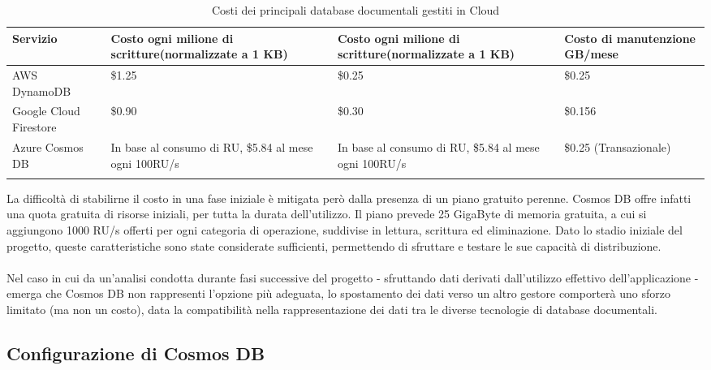 \begin{longtable}{|P{3.2cm}|P{4.2cm}|P{4.2cm}|P{3cm}|}
    \hline
    \textbf{Servizio}      & \textbf{Costo ogni milione di scritture}\newline(normalizzate a 1 KB) & \textbf{Costo ogni milione di scritture}\newline (normalizzate a 1 KB) & \textbf{Costo di manutenzione GB/mese} \\
    \hline
    \endhead
    AWS DynamoDB           & \$1.25                                                                & \$0.25                                                                 & \$0.25                                 \\
    \hline
    Google Cloud Firestore & \$0.90                                                                & \$0.30                                                                 & \$0.156                                \\
    \hline
    Azure Cosmos DB        & In base al consumo di RU, \$5.84 al mese ogni 100RU/s                 & In base al consumo di RU, \$5.84 al mese ogni 100RU/s                  & \$0.25 (Transazionale)                 \\
    \hline
    \caption{Costi dei principali database documentali gestiti in Cloud}
\end{longtable}

La difficoltà di stabilirne il costo in una fase iniziale
è mitigata però dalla presenza di un piano gratuito perenne.
Cosmos DB offre infatti una quota gratuita di risorse iniziali,
per tutta la durata dell'utilizzo.
Il piano prevede 25 GigaByte di memoria gratuita,
a cui si aggiungono 1000 RU/s offerti per ogni categoria di operazione,
suddivise in lettura, scrittura ed eliminazione.
Dato lo stadio iniziale del progetto,
queste caratteristiche sono state considerate sufficienti,
permettendo di sfruttare e testare le sue capacità di distribuzione.\\
\\
Nel caso in cui da un'analisi condotta durante fasi successive del progetto
- sfruttando dati derivati dall'utilizzo effettivo dell'applicazione -
emerga che Cosmos DB non rappresenti l'opzione più adeguata,
lo spostamento dei dati verso un altro gestore comporterà uno sforzo limitato (ma non un costo),
data la compatibilità nella rappresentazione dei dati
tra le diverse tecnologie di database documentali.

\subsection{Configurazione di Cosmos DB}

